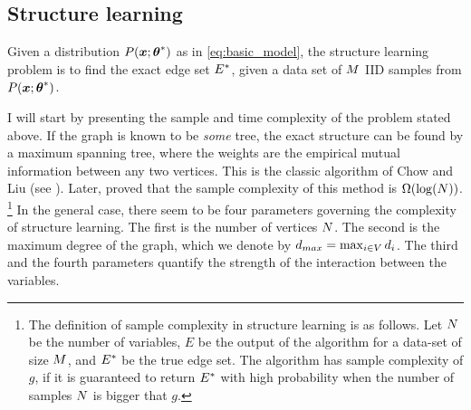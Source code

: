 \subsection{Structure learning}
\label{sec:structure}
Given a distribution $P(\boldsymbol{x};{\boldsymbol{\theta}}^{*})$ as in \eqref{eq:basic_model},
the structure learning problem is to find the exact edge set ${E}^{*}$, given a data set of $M$ IID samples from $P(\boldsymbol{x};{\boldsymbol{\theta}}^{*})$.

I will start by presenting the sample and time complexity of the problem stated above. 
If the graph is known to be {\em some} tree, the exact structure can be found by a maximum spanning tree, where the weights are the empirical mutual information between any two vertices. This is the classic algorithm of Chow and Liu (see \cite{chowLiu}). Later, \cite{tan2011large} proved that the sample complexity of this method is $\Omega(\log({N}))$.%
\footnote{The definition of sample complexity in structure learning is as follows. Let $N$ be the number of variables, $E$ be the output of the algorithm for a data-set of size $M$, and ${E}^{*}$ be the true edge set. The algorithm has sample complexity of $g$, if it is guaranteed to return ${E}^{*}$ with high probability when the number of samples $N$ is bigger that $g$.}
In the general case, there seem to be four parameters governing the complexity of structure learning.
The first is the number of vertices $N$.
The second is the maximum degree of the graph, which we denote by $d_{max} = \max_{i \in V} d_i$.
The third and the fourth parameters quantify the strength of the interaction between the variables.


